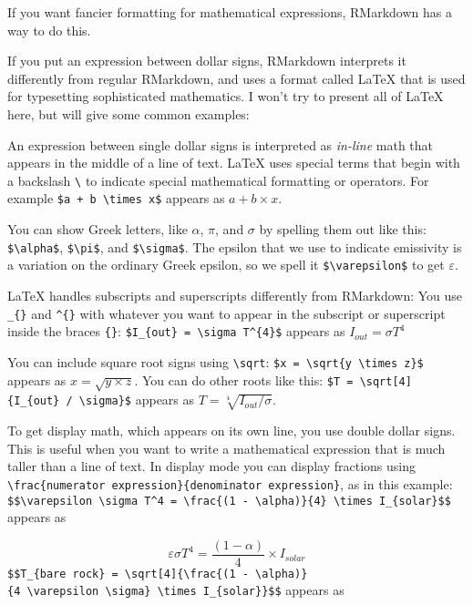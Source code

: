 \documentclass[
]{article}
\begin{document}
If you want fancier formatting for mathematical expressions, RMarkdown
has a way to do this.

If you put an expression between dollar signs, RMarkdown interprets it
differently from regular RMarkdown, and uses a format called LaTeX that
is used for typesetting sophisticated mathematics. I won't try to
present all of LaTeX here, but will give some common examples:

An expression between single dollar signs is interpreted as
\emph{in-line} math that appears in the middle of a line of text. LaTeX
uses special terms that begin with a backslash \texttt{\textbackslash{}}
to indicate special mathematical formatting or operators. For example
\texttt{\$a\ +\ b\ \textbackslash{}times\ x\$} appears as
\(a + b \times x\).

You can show Greek letters, like \(\alpha\), \(\pi\), and \(\sigma\) by
spelling them out like this: \texttt{\$\textbackslash{}alpha\$},
\texttt{\$\textbackslash{}pi\$}, and \texttt{\$\textbackslash{}sigma\$}.
The epsilon that we use to indicate emissivity is a variation on the
ordinary Greek epsilon, so we spell it
\texttt{\$\textbackslash{}varepsilon\$} to get \(\varepsilon\).

LaTeX handles subscripts and superscripts differently from RMarkdown:
You use \texttt{\_\{\}} and \texttt{\^{}\{\}} with whatever you want to
appear in the subscript or superscript inside the braces \texttt{\{\}}:
\texttt{\$I\_\{out\}\ =\ \textbackslash{}sigma\ T\^{}\{4\}\$} appears as
\(I_{out} = \sigma T^{4}\)

You can include square root signs using \texttt{\textbackslash{}sqrt}:
\texttt{\$x\ =\ \textbackslash{}sqrt\{y\ \textbackslash{}times\ z\}\$}
appears as \(x = \sqrt{y \times z}\). You can do other roots like this:
\texttt{\$T\ =\ \textbackslash{}sqrt{[}4{]}\{I\_\{out\}\ /\ \textbackslash{}sigma\}\$}
appears as \(T = \sqrt[4]{I_{out} / \sigma}\).

To get display math, which appears on its own line, you use double
dollar signs. This is useful when you want to write a mathematical
expression that is much taller than a line of text. In display mode you
can display fractions using
\texttt{\textbackslash{}frac\{numerator\ expression\}\{denominator\ expression\}},
as in this example:
\texttt{\$\$\textbackslash{}varepsilon\ \textbackslash{}sigma\ T\^{}4\ =\ \textbackslash{}frac\{(1\ -\ \textbackslash{}alpha)\}\{4\}\ \textbackslash{}times\ I\_\{solar\}\$\$}
appears as

\[ \varepsilon \sigma T^4 = \frac{(1 - \alpha)}{4} \times I_{solar}\]
\texttt{\$\$T\_\{bare\ rock\}\ =\ \textbackslash{}sqrt{[}4{]}\{\textbackslash{}frac\{(1\ -\ \textbackslash{}alpha)\}\{4\ \textbackslash{}varepsilon\ \textbackslash{}sigma\}\ \textbackslash{}times\ I\_\{solar\}\}\$\$}
appears as
\end{document}
